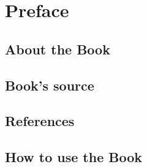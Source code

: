 \chapter*{Preface}
\section*{About the Book}
\section*{Book's source}
\section*{References}
\section*{How to use the Book}

